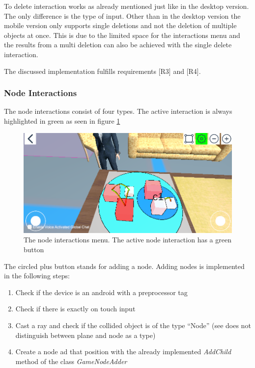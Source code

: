 To delete interaction works as already mentioned just like in the desktop version. 
The only difference is the type of input. 
Other than in the desktop version the mobile version only supports single deletions and not the deletion of multiple objects at once.
This is due to the limited space for the interactions menu and the results from a multi deletion can also be achieved with the single delete interaction.

The discussed implementation fulfills requirements [R3] and [R4].
\subsubsection{Node Interactions}
The node interactions consist of four types.
The active interaction is always highlighted in green as seen in figure \ref{fig:node}
\begin{figure}[htb]
    \centering
    \includegraphics[width=1\textwidth]{Implementation/img/node.png}
    \caption{The node interactions menu. The active node interaction has a green button}\label{fig:node}
\end{figure}

The circled plus button stands for adding a \gls{node}.
Adding \glspl{node} is implemented in the following steps:
\begin{enumerate}
    \item Check if the device is an \gls{android} with a preprocessor tag
    \item Check if there is exactly on touch input
    \item Cast a ray and check if the collided object is of the type \enquote{Node} (\gls{see} does not distinguish between \gls{plane} and \gls{node} as a type)
    \item Create a \gls{node} ad that position with the already implemented \textit{AddChild} method of the class \textit{GameNodeAdder}
\end{enumerate}

